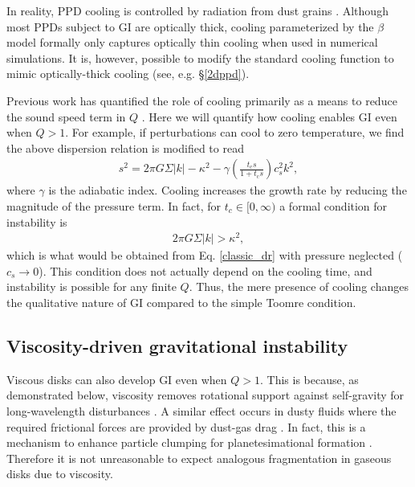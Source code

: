 \documentclass[iop, numberedappendix]{emulateapj}
\newcommand{\tcool}{t_\mathrm{c}}
\begin{document}
In reality, PPD cooling is controlled by radiation   
from dust grains \citep{bell94,dalessio97,chiang97}. Although most
PPDs subject to GI are optically thick, cooling parameterized by the
$\beta$ model formally only captures optically thin cooling when
used in numerical simulations. It is, however, possible to modify the
standard cooling function to mimic optically-thick cooling (see,
e.g. \S\ref{2dppd}).  

Previous work has quantified the role of cooling primarily as a means to reduce the sound speed term
in $Q$ \citep[though see e.g.,][]{clarke07}. Here we will quantify how cooling enables GI
even when $Q>1$. For example, if perturbations can
cool to zero temperature, we find the above dispersion relation is
modified to read 
\begin{align}\label{cool_dr}
s^2 = 2\pi G\Sigma |k| - \kappa^2 - \gamma \left(\frac{\tcool s}{1 +
  \tcool s}\right)c_s^2k^2,
\end{align}
where $\gamma$ is the adiabatic index. Cooling increases the growth
rate by reducing the magnitude of the 
pressure term. In fact, for $t_c\in[0,\infty)$ a formal condition
for instability is  
\begin{align*}
  2\pi G \Sigma |k| > \kappa^2,
\end{align*}
which is what would be obtained from Eq. \ref{classic_dr} with 
pressure neglected ($c_s\to 0$). This condition does not actually
depend on the cooling time, and instability is
possible for any finite $Q$. %
Thus, the mere presence of cooling changes the qualitative nature of
GI compared to the simple Toomre condition. 
   


\subsection{Viscosity-driven gravitational instability}\label{visc_gi}
Viscous disks can also develop GI even when $Q>1$. This is because, as 
demonstrated below, viscosity removes rotational support against  
self-gravity for long-wavelength disturbances 
\citep{lynden-bell74,willerding92,gammie96}. A similar effect   
occurs in dusty fluids where the required frictional forces are 
provided by dust-gas drag \citep{ward00, takahashi14}. 
In fact, this
is a mechanism to enhance particle clumping for planetesimational
formation %
\citep{youdin11}. Therefore it is not unreasonable to expect analogous
fragmentation in gaseous disks due to viscosity.   
\end{document}
